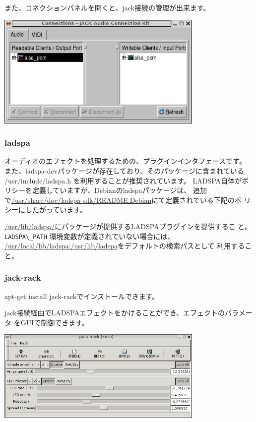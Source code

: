 \documentclass[mingoth,a4paper]{jsarticle}
\begin{document}
また、コネクションパネルを開くと、jack接続の管理が出来ます。

\includegraphics[width=10cm]{image200602/qjackctl-2.png}

\subsubsection{ladspa}

オーディオのエフェクトを処理するための、プラグインインタフェースです。
また、ladspa-devパッケージが存在しており、そのパッケージに含まれている
/usr/include/ladspa.h を利用することが推奨されています。
LADSPA自体がポリシーを定義していますが、Debianのladspaパッケージは、
追加で\url{/usr/share/doc/ladspa-sdk/README.Debian}にて定義されている下記のポ
リシーにしたがっています。

\url{/usr/lib/ladspa/}にパッケージが提供するLADSPAプラグインを提供するこ
と。\verb!LADSPA\_PATH! 環境変数が定義されていない場合には、
\url{/usr/local/lib/ladspa:/usr/lib/ladspa}をデフォルトの検索パスとして
利用すること。

\subsubsection{jack-rack}

apt-get install jack-rackでインストールできます。

jack接続経由でLADSPAエフェクトをかけることができ、エフェクトのパラメータ
をGUIで制御できます。

\includegraphics[width=10cm]{image200602/jack-rack.png}
\end{document}

